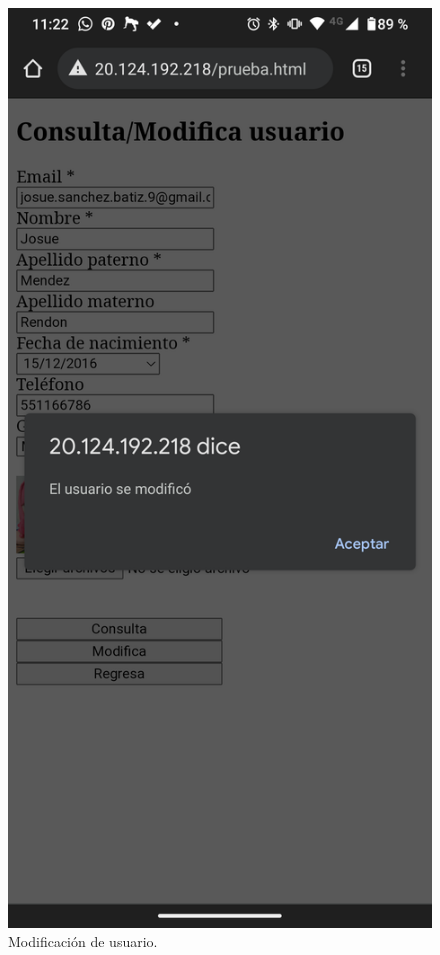 \documentclass[11pt]{article}
\begin{document}
		\begin{figure}[H]
			\centering
			\includegraphics[scale=0.18]{resources/Screenshot_20211219-232216.png}
			\caption{Modificación de usuario.}\label{fig:picture}
		\end{figure}
\end{document}
